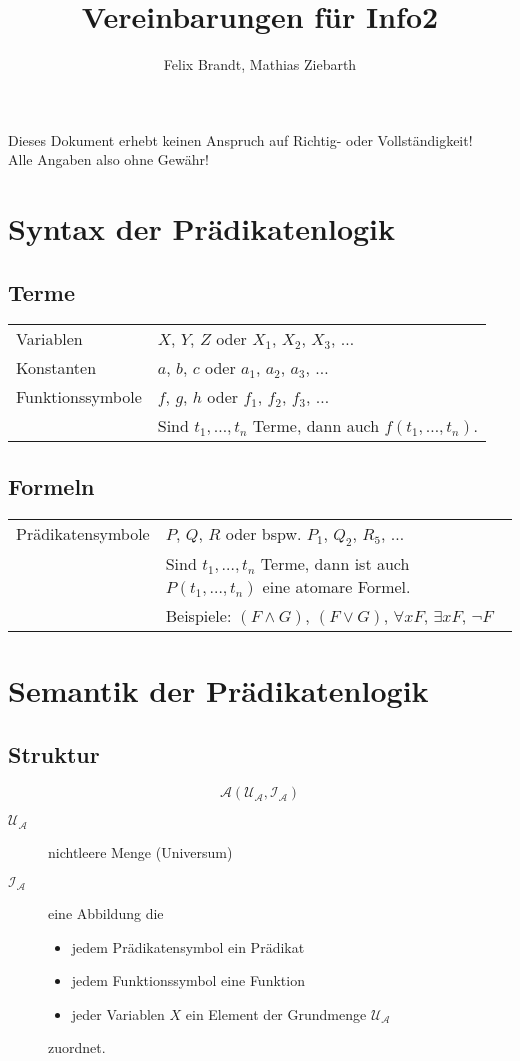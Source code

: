 \documentclass{article}
\title{Vereinbarungen für Info2}
\author{Felix Brandt, Mathias Ziebarth}
\begin{document}
\def\A{\mathcal{A}}
\def\U{\mathcal{U}}
\def\I{\mathcal{I}}

\begin{center}
	Dieses Dokument erhebt keinen Anspruch auf Richtig- oder Vollständigkeit!\\
	Alle Angaben also ohne Gewähr!
\end{center}
	
\section{Syntax der Prädikatenlogik}
	\subsection{Terme}
		\begin{tabular}{ll}
			Variablen        & $X$, $Y$, $Z$ oder $X_1$, $X_2$, $X_3$, $\ldots$\\
			Konstanten       & $a$, $b$, $c$ oder $a_1$, $a_2$, $a_3$, $\ldots$\\
			Funktionssymbole & $f$, $g$, $h$ oder $f_1$, $f_2$, $f_3$, $\ldots$\\
											 &Sind $t_1, \ldots, t_n$ Terme, dann auch $f(t_1, \ldots, t_n)$.\\
		\end{tabular}
	\subsection{Formeln}
		\begin{tabular}{ll}
			Prädikatensymbole & $P$, $Q$, $R$ oder bspw. $P_1$, $Q_2$, $R_5$, $\ldots$\\
												&Sind $t_1, \ldots, t_n$ Terme, dann ist auch $P(t_1, \ldots, t_n)$ eine atomare Formel.\\
												&Beispiele: $(F \wedge G)$, $(F \vee G)$, $\forall xF$, $\exists xF$, $\neg F$\\
		\end{tabular}

\section{Semantik der Prädikatenlogik}
	\subsection{Struktur}
		$$\A(\U_\A, \I_\A)$$	
		
		\begin{description}
		\item[$\U_\A$] nichtleere Menge (Universum)
		
		\item[$\I_\A$] eine Abbildung die
			\begin{itemize}
				\item jedem Prädikatensymbol ein Prädikat
				\item jedem Funktionssymbol eine Funktion
				\item jeder Variablen $X$ ein Element der Grundmenge $\U_\A$
			\end{itemize}	
			zuordnet.
		\end{description}
			
\end{document}
